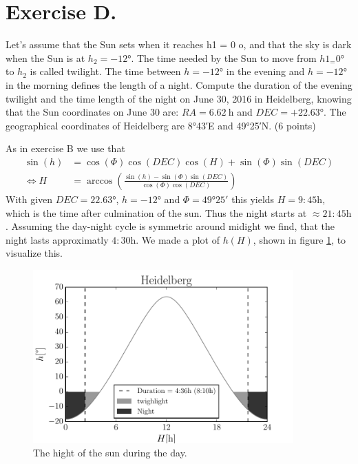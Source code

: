 \documentclass[11pt,a4paper,twoside]{article}
\newcommand{\op}[1]{\operatorname{#1}}
\begin{document}
\section*{Exercise D.}

Let's assume that the Sun sets when it reaches h1 = 0 o, and that the sky is
dark when the Sun is at $h_2 = \ang{-12}$. The time needed by the Sun to 
move from $h1_ = \ang{0}$ to $h_2$ is called twilight. The time between 
$h = \ang{-12}$ in the evening and $h = \ang{-12}$ in the 
morning defines the length of a night.
Compute the duration of the evening twilight and the time length of the night 
on June 30, 2016 in Heidelberg, knowing that the Sun coordinates on June 30 
are: $RA = \SI{6.62}{\hour}$ and $DEC = +\ang{22.63}.$
The geographical coordinates of Heidelberg are \ang{8;43;}E and \ang{49;25;}N. (6 points)

As in exercise B we use that 
\begin{align}
    \op{sin}(h) &=  \op{cos}(\Phi)\op{cos}(DEC)\op{cos}(H) + 
                    \op{sin}(\Phi)\op{sin}(DEC) \\
    \Leftrightarrow H &=   \op{arccos} \left(
                            \frac{\op{sin}(h) - \op{sin}(\Phi)\op{sin}(DEC)}
                                 {\op{cos}(\Phi)\op{cos}(DEC)} \right)
\end{align}
With given $DEC = \ang{22.63}$, $h = \ang{-12}$ and $\Phi = \ang{49;25;}$ 
this yields $H = 9:45\si{\hour}$, which is the time after culmination of the 
sun. Thus the night starts at $\approx 21:45\si{\hour}$. Assuming the day-night 
cycle is symmetric around midight we find, that the night lasts approximatly
$4:30 \si{\hour}$. We made a plot of $h(H)$, shown in figure \ref{fig:h}, 
to visualize this.

\begin{figure}
\centering
\includegraphics[width=10cm]{pic/night}
\caption{The hight of the sun during the day.}
\label{fig:h}
\end{figure}
\end{document}

